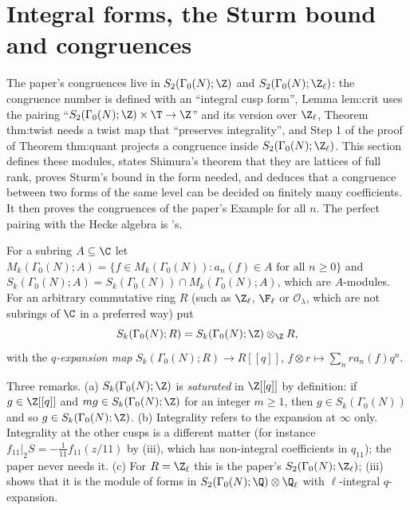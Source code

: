 \section{Integral forms, the Sturm bound and congruences}\label{sec:modforms:integral}

The paper's congruences live in $S_2(\Gamma_0(N);\Z)$ and $S_2(\Gamma_0(N);\Z_\ell)$: the congruence number is defined with an ``integral cusp form'', Lemma lem:crit uses the pairing
``$S_2(\Gamma_0(N);\Z)\times\T\to\Z$'' and its version over $\Z_\ell$, Theorem thm:twist needs a twist map that ``preserves integrality'', and Step 1 of the proof of Theorem thm:quant
projects a congruence inside $S_2(\Gamma_0(N);\Z_\ell)$. This section defines these modules, states Shimura's theorem that they are lattices of full rank, proves Sturm's bound in
the form needed, and deduces that a congruence between two forms of the same level can be decided on finitely many coefficients. It then proves the congruences of the
paper's Example for all $n$. The perfect pairing with the Hecke algebra is 's.

\begin{definition}\label{def:modforms:integral-forms}
For a subring $A\subseteq\C$ let $M_k(\Gamma_0(N);A)=\{f\in M_k(\Gamma_0(N)):a_n(f)\in A\text{ for all }n\ge0\}$ and $S_k(\Gamma_0(N);A)=S_k(\Gamma_0(N))\cap M_k(\Gamma_0(N);A)$, which are
$A$-modules. For an arbitrary commutative ring $R$ (such as $\Z_\ell$, $\F_\ell$ or $\mathcal O_\lambda$, which are not subrings of $\C$ in a preferred way) put
\[
S_k(\Gamma_0(N);R)=S_k(\Gamma_0(N);\Z)\otimes_\Z R,
\]
with the \emph{$q$-expansion map} $S_k(\Gamma_0(N);R)\to R[[q]]$, $f\otimes r\mapsto\sum_nra_n(f)q^n$.
\end{definition}

Three remarks. (a) $S_k(\Gamma_0(N);\Z)$ is \emph{saturated} in $\Z[[q]]$ by definition: if $g\in\Z[[q]]$ and $mg\in S_k(\Gamma_0(N);\Z)$ for an integer $m\ge1$, then $g\in S_k(\Gamma_0(N))$ and so
$g\in S_k(\Gamma_0(N);\Z)$. (b) Integrality refers to the expansion at $\infty$ only. Integrality at the other cusps is a different matter (for instance $f_{11}|_2S=-\frac1{11}f_{11}(z/11)$ by
(iii), which has non-integral coefficients in $q_{11}$); the paper never needs it. (c) For $R=\Z_\ell$ this is the paper's $S_2(\Gamma_0(N);\Z_\ell)$;
(iii) shows that it is the module of forms in $S_2(\Gamma_0(N);\Q)\otimes\Q_\ell$ with $\ell$-integral $q$-expansion.

